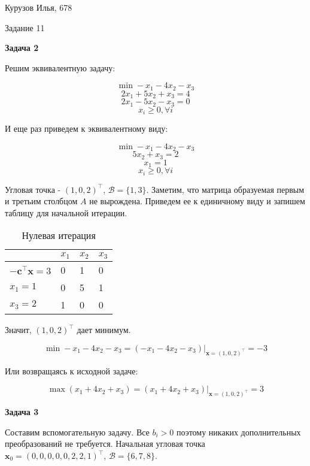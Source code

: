 \documentclass[12pt]{article}
\begin{document}
\begin{center}
	{Курузов Илья, 678}

	{Задание 11}
\end{center}

\begin{center}
	\textbf{Задача 2}
\end{center}

Решим эквивалентную задачу:

$$\min -x_1-4x_2-x_3$$
$$2x_1+5x_2+x_3=4$$
$$2x_1-5x_2-x_3=0$$
$$x_i \geq 0, \forall i$$

И еще раз приведем к эквивалентному виду:

$$\min -x_1-4x_2-x_3$$
$$5x_2+x_3=2$$
$$x_1 = 1$$
$$x_i \geq 0, \forall i$$

Угловая точка - $(1,0,2)^\top$, $\mathcal{B} = \{1, 3\}$. Заметим, что матрица образуемая первым и третьим столбцом $A$ не вырождена. Приведем ее к единичному виду и запишем таблицу для начальной итерации.

\begin{table}[H]
\caption{Нулевая итерация}
\begin{center}
\begin{tabular}{|l|lll}
\hline
 &{ $x_1$} & {$x_2$} & \multicolumn{1}{l|}{$x_3$}\\ \hline
$-\textbf{c}^\top \textbf{x} = 3$ &          0             &    1                   &\multicolumn{1}{l|}{0}  \\ \hline
$x_1 = 1$ &          0             &    5                   &\multicolumn{1}{l|}{1}  \\
$x_3 = 2$ &           1            &     0                  &\multicolumn{1}{l|}{0}                      \\\hline
\end{tabular}
\end{center}
\end{table}

Значит, $(1,0,2)^\top$ дает минимум.

$$\min -x_1-4x_2-x_3 = (-x_1-4x_2-x_3)|_{\textbf{x}=(1,0,2)^\top} =-3 $$

Или возвращаясь к исходной задаче:

$$\boxed{\max (x_1+4x_2+x_3) = (x_1+4x_2+x_3)|_{\textbf{x}=(1,0,2)^\top} =3}$$

\begin{center}
	\textbf{Задача 3}
\end{center}

Составим вспомогательную задачу. Все $b_i>0$ поэтому никаких дополнительных преобразований не требуется. Начальная угловая точка $\textbf{x}_0 = (0,0,0,0,0,2,2,1)^\top$, $\mathcal{B} = \{6,7,8\}$.
\end{document}
